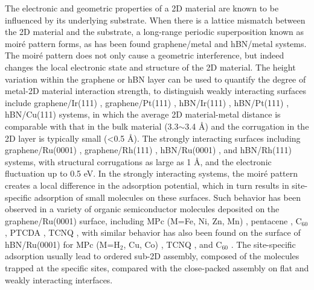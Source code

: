 The electronic and geometric properties of a 2D material are known to be
influenced by its underlying substrate. When there is a lattice
mismatch between the 2D material and the substrate, a long-range
periodic superposition known as moiré pattern forms, as has been
found graphene/metal \cite{Hamalainen_2013_moire_gr} and hBN/metal
\cite{Schulz_2014_hBN_moire} systems.  The
moiré pattern does not only cause a geometric interference, but
indeed changes the local electronic state and structure of the 2D
material.
%
The height variation within the graphene or hBN layer can be used to
quantify the degree of metal-2D material interaction strength, to
distinguish weakly interacting surfaces include graphene/Ir(111)
\cite{Pletikosi_2009_gr_Ir,Busse_2011_Gr_Ir,Hamalainen_2013_moire_gr},
graphene/Pt(111) \cite{Sutter_2009_Gr_Pt}, hBN/Ir(111)
\cite{Schulz_2014_hBN_moire}, hBN/Pt(111) \cite{Cavar_2008_hBN_Pt},
hBN/Cu(111) \cite{Joshi_2012_hBN_Cu} systems, in which the average 2D
material-metal distance is comparable with that in the bulk material
(3.3$\sim{}$3.4 \AA{}) and the corrugation in the 2D layer is
typically small (<0.5 \AA{}). The strongly interacting surfaces
including graphene/Ru(0001) \cite{Moritz_2010_gr_Ru} , graphene/Rh(111) \cite{Wang_2010_gr_Rh}, hBN/Ru(0001)
\cite{Wang_2010_gr_Rh}, and hBN/Rh(111) \cite{Dil_2008_hBN_Rh}
systems, with structural corrugations as large as 1 \AA{}, and the
electronic fluctuation up to 0.5 eV. In the strongly interacting
systems, the moiré pattern creates a local difference in the
adsorption potential, which in turn results in site-specific
adsorption of small molecules on these surfaces. Such behavior has
been observed in a variety of organic semiconductor molecules
deposited on the graphene/Ru(0001) surface, including MPc (M=Fe, Ni,
Zn, Mn) \cite{Mao_2009_Pc_gr_kagome,Zhang_2011_FePc_gr}, pentacene
\cite{Zhou_2013_penta_gr_Ru}, C\(_{\text{60}}\)
\cite{Li_2012_c60_gr_Ru}, PTCDA \cite{Zhou_2011_PTCDA_gr_Ru}, TCNQ
\cite{Maccariello_2014_TCNQ_gr_Ru}, with similar behavior has also
been found on the surface of hBN/Ru(0001) for MPc (M=H\(_{\text{2}}\),
Cu, Co) \cite{Dil_2008_hBN_Rh,Jarvinen_2014_MPc_hBN_Ru}, TCNQ
\cite{Joshi_2014_TCNQ_hBN}, and C\(_{\text{60}}\)
\cite{Corso_2004_C60_hBN}. The site-specific adsorption usually lead
to ordered sub-2D assembly, composed of the molecules trapped at the
specific sites, compared with the close-packed assembly on flat and
weakly interacting interfaces.

